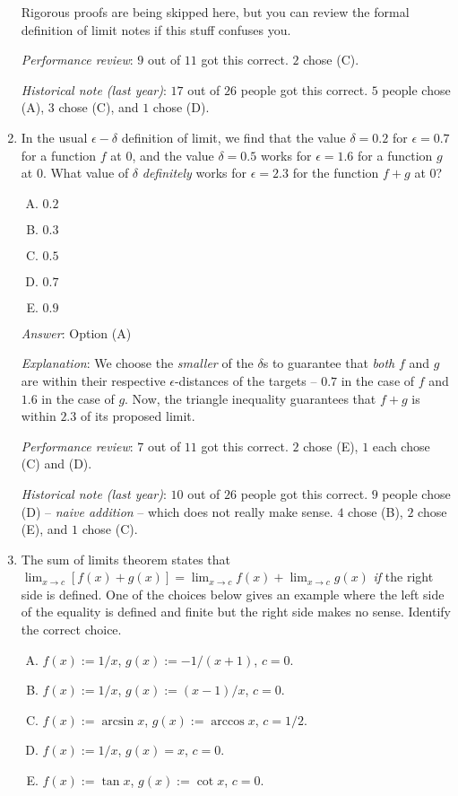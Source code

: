 \documentclass[10pt]{amsart}
\begin{document}
\begin{enumerate}
  Rigorous proofs are being skipped here, but you can review the
  formal definition of limit notes if this stuff confuses you.

  {\em Performance review}: $9$ out of $11$ got this correct. $2$
  chose (C).

  {\em Historical note (last year)}: $17$ out of $26$ people got this
  correct. $5$ people chose (A), $3$ chose (C), and $1$ chose (D).

\item In the usual $\epsilon-\delta$ definition of limit, we find that
  the value $\delta = 0.2$ for $\epsilon = 0.7$ for a function $f$ at
  $0$, and the value $\delta = 0.5$ works for $\epsilon = 1.6$ for a
  function $g$ at $0$. What value of $\delta$ {\em definitely} works
  for $\epsilon = 2.3$ for the function $f + g$ at $0$?

  \begin{enumerate}[(A)]
  \item $0.2$
  \item $0.3$
  \item $0.5$
  \item $0.7$
  \item $0.9$
  \end{enumerate}

  {\em Answer}: Option (A)

  {\em Explanation}: We choose the {\em smaller} of the $\delta$s to
  guarantee that {\em both} $f$ and $g$ are within their respective
  $\epsilon$-distances of the targets -- $0.7$ in the case of $f$ and
  $1.6$ in the case of $g$. Now, the triangle inequality guarantees
  that $f + g$ is within $2.3$ of its proposed limit.

  {\em Performance review}: $7$ out of $11$ got this correct. $2$
  chose (E), $1$ each chose (C) and (D).

  {\em Historical note (last year)}: $10$ out of $26$ people got this
  correct. $9$ people chose (D) -- {\em naive addition} -- which does
  not really make sense. $4$ chose (B), $2$ chose (E), and $1$ chose
  (C).
\item The sum of limits theorem states that $\lim_{x \to c} [f(x) +
  g(x)] = \lim_{x \to c} f(x) + \lim_{x \to c} g(x)$ {\em if} the
  right side is defined. One of the choices below gives an example
  where the left side of the equality is defined and finite but the right side
  makes no sense. Identify the correct choice.

  \begin{enumerate}[(A)]
  \item $f(x) := 1/x$, $g(x) := -1/(x + 1)$, $c = 0$.
  \item $f(x) := 1/x$, $g(x) := (x - 1)/x$, $c = 0$.
  \item $f(x) := \arcsin x$, $g(x) := \arccos x$, $c = 1/2$.
  \item $f(x) := 1/x$, $g(x) = x$, $c = 0$.
  \item $f(x) := \tan x$, $g(x) := \cot x$, $c = 0$.
  \end{enumerate}


\end{enumerate}
\end{document}
